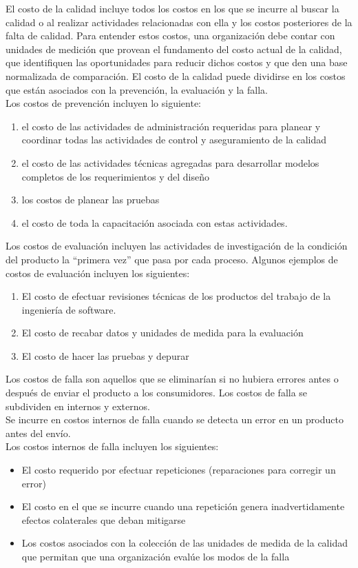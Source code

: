El costo de la calidad incluye todos los costos en los que se incurre al buscar la calidad o al realizar actividades relacionadas con ella y los costos posteriores de la falta de calidad. Para entender estos costos, una organización debe contar con unidades de medición que provean el fundamento del costo actual de la calidad, que identifiquen las oportunidades para reducir dichos costos y que den una base normalizada de comparación. El costo de la calidad puede dividirse en los costos que están asociados con la prevención, la evaluación y la falla.\\
Los costos de prevención incluyen lo siguiente: \\
\begin{enumerate}
    \item  el costo de las actividades de administración
requeridas para planear y coordinar todas las actividades de control y aseguramiento de la calidad
    \item el costo de las actividades técnicas agregadas para desarrollar modelos completos de los requerimientos y del diseño
    \item los costos de planear las pruebas
    \item el costo de toda la
capacitación asociada con estas actividades.
\end{enumerate}
Los costos de evaluación incluyen las actividades de investigación de la condición del producto la “primera vez” que pasa por cada proceso. Algunos ejemplos de costos de evaluación incluyen los siguientes:\\
\begin{enumerate}
    \item  El costo de efectuar revisiones técnicas de los productos del trabajo de la ingeniería de software.
    \item El costo de recabar datos y unidades de medida para la evaluación
    \item El costo de hacer las pruebas y depurar
\end{enumerate}
Los costos de falla son aquellos que se eliminarían si no hubiera errores antes o después de enviar el producto a los consumidores. Los costos de falla se subdividen en internos y externos.\\
Se incurre en costos internos de falla cuando se detecta un error en un producto antes del envío.\\
Los costos internos de falla incluyen los siguientes:\\
\begin{itemize}
    \item El costo requerido por efectuar repeticiones (reparaciones para corregir un error)
    \item El costo en el que se incurre cuando una repetición genera inadvertidamente efectos colaterales que deban mitigarse
    \item Los costos asociados con la colección de las unidades de medida de la calidad que permitan que una organización evalúe los modos de la falla
\end{itemize}
